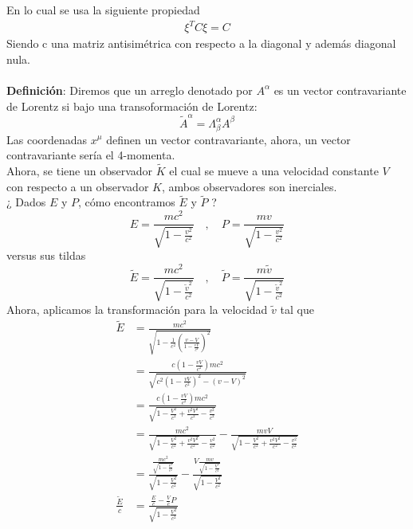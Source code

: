 \documentclass[../main.tex]{subfiles}
\begin{document}
En lo cual se usa la siguiente propiedad
\begin{align*}
  \xi^T C \xi = C 
\end{align*}
Siendo c una matriz antisimétrica con respecto a la diagonal y además diagonal nula. \\
\\
\textbf{Definición}: Diremos que un arreglo denotado por $A^\alpha$ es un vector contravariante de Lorentz si bajo una transoformación de Lorentz: 
\begin{equation}
  \tilde{A}^\alpha = \Lambda_\beta^\alpha A^\beta
\end{equation}
Las coordenadas $x^\mu$ definen un vector contravariante, ahora, un vector contravariante sería el 4-momenta. \\
Ahora, se tiene un observador $\tilde{K}$ el cual se mueve a una velocidad constante $V$ con respecto a un observador $K$, ambos observadores son inerciales. \\
¿ Dados $E$ y $P$, cómo encontramos $\tilde{E}$ y $\tilde{P}$ ? 
\begin{equation*}
  E= \frac{mc^2}{\sqrt{1-\frac{v^2}{c^2}}} \quad , \quad P=\frac{mv}{\sqrt{1-\frac{v^2}{c^2}}}
\end{equation*}
versus sus tildas
\begin{equation*}
  \tilde{E} = \frac{mc^2}{\sqrt{1-\frac{\tilde{v}^2}{c^2}}}\quad , \quad \tilde{P}= \frac{m\tilde{v}}{\sqrt{1-\frac{\tilde{v}^2}{c^2}}}
\end{equation*}
Ahora, aplicamos la transformación para la velocidad $\tilde{v}$ tal que
\begin{align*}
  \tilde{E} & = \frac{mc^2}{\sqrt{1-\frac{1}{c^2}\left( \frac{v-V}{1-\frac{vV}{c^2}} \right)^2}}\\
  & = \frac{c\left( 1-\frac{vV}{c^2} \right)mc^2}{\sqrt{c^2\left( 1-\frac{vV}{c^2} \right)^2 - (v-V)^2}} \\
  & = \frac{c(1-\frac{vV}{c^2})mc^2}{\sqrt{1-\frac{V^2}{c^2}+ \frac{v^2V^2}{c^2}-\frac{v^2}{c^2}}} \\
  & = \frac{mc^2}{\sqrt{1-\frac{V^2}{c^2} + \frac{v^2V^2}{c^2}} - \frac{v^2}{c^2}}  - \frac{mvV}{\sqrt{1-\frac{V^2}{c^2} + \frac{v^2V^2}{c^2} - \frac{v^2}{c^2}}}\\
  & = \frac{\frac{mc^2}{\sqrt{1-\frac{v^2}{c^2}}}}{\sqrt{1-\frac{V^2}{c^2}}} - \frac{V\frac{mv}{\sqrt{1-\frac{V^2}{c^2}}}}{\sqrt{1-\frac{V^2}{c^2}}} \\
  \frac{\tilde{E}}{c}& = \frac{\frac{E}{c}-\frac{V}{c}P}{\sqrt{1-\frac{V^2}{c^2}}}
\end{align*}
\end{document}
